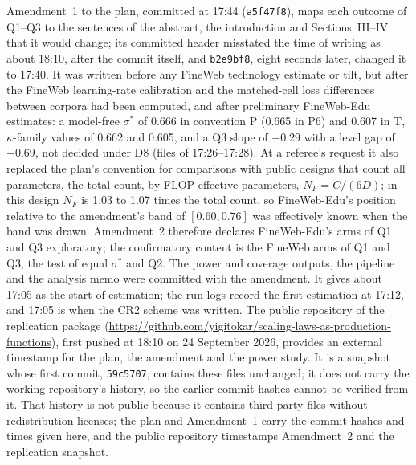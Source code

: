 Amendment~1 to the plan, committed at 17:44 (\texttt{a5f47f8}), maps each outcome of Q1--Q3 to the sentences of the
abstract, the introduction and Sections~III--IV that it would change; its committed header misstated the time of writing
as about 18:10, after the commit itself, and \texttt{b2e9bf8}, eight seconds later, changed it to 17:40. It was written
before any FineWeb technology estimate or tilt, but after the FineWeb learning-rate calibration and the matched-cell loss
differences between corpora had been computed, and after preliminary FineWeb-Edu estimates: a model-free $\sigma^*$ of
0.666 in convention P (0.665 in P6) and 0.607 in T, $\kappa$-family values of 0.662 and 0.605, and a Q3 slope of $-0.29$
with a level gap of $-0.69$, not decided under D8 (files of 17:26--17:28). At a referee's request it also replaced the
plan's convention for comparisons with public designs that count all parameters, the total count, by FLOP-effective
parameters, $N_F=C/(6D)$; in this design $N_F$ is 1.03 to 1.07 times the total count, so FineWeb-Edu's position relative
to the amendment's band of $[0.60,0.76]$ was effectively known when the band was drawn. Amendment~2 therefore declares
FineWeb-Edu's arms of Q1 and Q3 exploratory; the confirmatory content is the FineWeb arms of Q1 and Q3, the test of equal
$\sigma^*$ and Q2. The power and coverage outputs, the pipeline and the analysis memo were committed with the amendment. It gives about
17:05 as the start of estimation; the run logs record the first estimation at 17:12, and 17:05 is when the CR2 scheme was
written. The public repository of the replication package
(\url{https://github.com/yigitokar/scaling-laws-as-production-functions}), first pushed at 18:10 on 24 September 2026,
provides an external timestamp for the plan, the amendment and the power study. It is a snapshot whose first commit,
\texttt{59c5707}, contains these files unchanged; it does not carry the working repository's history, so the earlier
commit hashes cannot be verified from it. That history is not public because it contains third-party files without
redistribution licenses; the plan and Amendment~1 carry the commit hashes and times given here, and the public
repository timestamps Amendment~2 and the replication snapshot.

